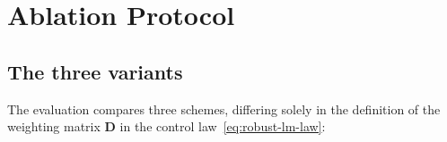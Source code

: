%
%
%
%

\section{Ablation Protocol}
\label{sec:ablation-protocol}

\subsection{The three variants}
\label{sec:ablation-variants}

The evaluation compares three schemes, differing solely in the definition of
the weighting matrix $\mathbf{D}$ in the control law~\eqref{eq:robust-lm-law}:

